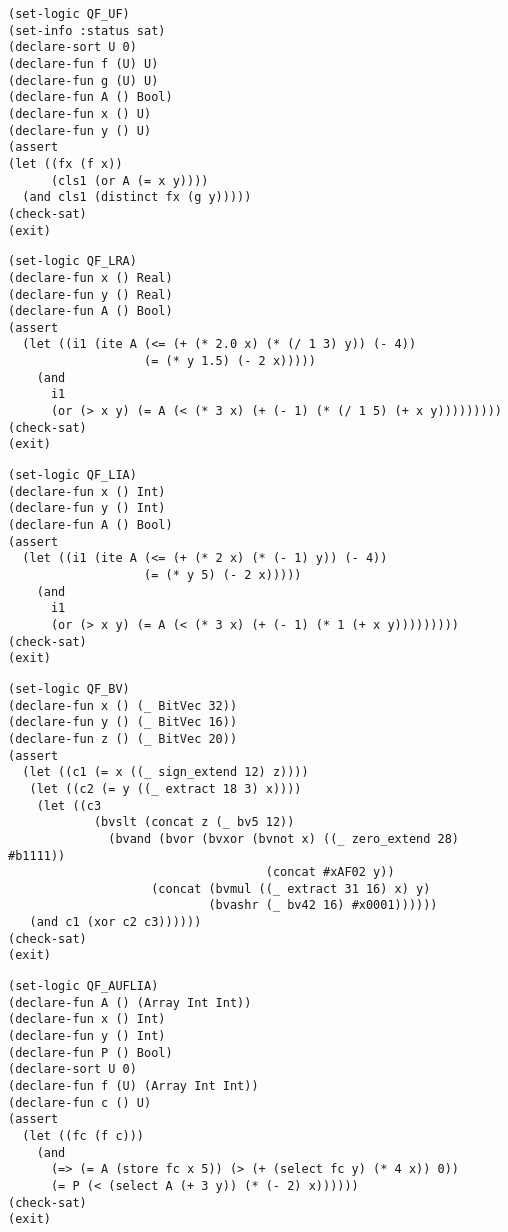 \documentclass[12pt]{article}
\begin{document}
{\footnotesize
\begin{verbatim}
(set-logic QF_UF)
(set-info :status sat)
(declare-sort U 0)
(declare-fun f (U) U)
(declare-fun g (U) U)
(declare-fun A () Bool)
(declare-fun x () U)
(declare-fun y () U)
(assert
(let ((fx (f x))
      (cls1 (or A (= x y))))
  (and cls1 (distinct fx (g y)))))
(check-sat)
(exit)
\end{verbatim}}



{\footnotesize
\begin{verbatim}
(set-logic QF_LRA)
(declare-fun x () Real)
(declare-fun y () Real)
(declare-fun A () Bool)
(assert
  (let ((i1 (ite A (<= (+ (* 2.0 x) (* (/ 1 3) y)) (- 4))
                   (= (* y 1.5) (- 2 x)))))
    (and
      i1
      (or (> x y) (= A (< (* 3 x) (+ (- 1) (* (/ 1 5) (+ x y)))))))))
(check-sat)
(exit)
\end{verbatim}}



{\footnotesize
\begin{verbatim}
(set-logic QF_LIA)
(declare-fun x () Int)
(declare-fun y () Int)
(declare-fun A () Bool)
(assert
  (let ((i1 (ite A (<= (+ (* 2 x) (* (- 1) y)) (- 4))
                   (= (* y 5) (- 2 x)))))
    (and
      i1
      (or (> x y) (= A (< (* 3 x) (+ (- 1) (* 1 (+ x y)))))))))
(check-sat)
(exit)
\end{verbatim}}



{\footnotesize
\begin{verbatim}
(set-logic QF_BV)
(declare-fun x () (_ BitVec 32))
(declare-fun y () (_ BitVec 16))
(declare-fun z () (_ BitVec 20))
(assert
  (let ((c1 (= x ((_ sign_extend 12) z))))
   (let ((c2 (= y ((_ extract 18 3) x))))
    (let ((c3 
            (bvslt (concat z (_ bv5 12)) 
              (bvand (bvor (bvxor (bvnot x) ((_ zero_extend 28) #b1111)) 
                                    (concat #xAF02 y))
                    (concat (bvmul ((_ extract 31 16) x) y) 
                            (bvashr (_ bv42 16) #x0001))))))
   (and c1 (xor c2 c3))))))
(check-sat)
(exit)
\end{verbatim}}



{\footnotesize
\begin{verbatim}
(set-logic QF_AUFLIA)
(declare-fun A () (Array Int Int))
(declare-fun x () Int)
(declare-fun y () Int)
(declare-fun P () Bool)
(declare-sort U 0)
(declare-fun f (U) (Array Int Int))
(declare-fun c () U)
(assert
  (let ((fc (f c)))
    (and
      (=> (= A (store fc x 5)) (> (+ (select fc y) (* 4 x)) 0))
      (= P (< (select A (+ 3 y)) (* (- 2) x))))))
(check-sat)
(exit)
\end{verbatim}}
\end{document}
